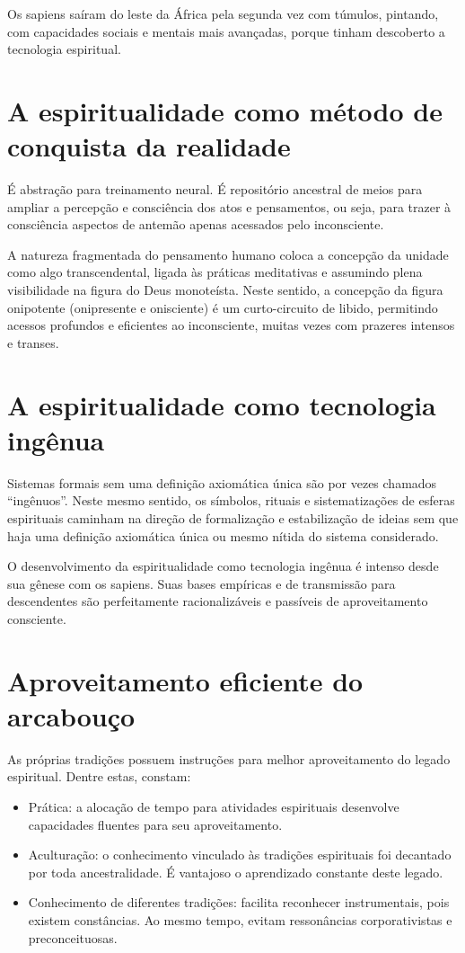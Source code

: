 \documentclass[a4paper]{article}
\begin{document}
\qquad Os sapiens saíram do leste da África pela segunda vez com túmulos,
pintando, com capacidades sociais e mentais mais avançadas, porque tinham
descoberto a tecnologia espiritual.

\section{A espiritualidade como método de conquista da realidade}\label{met}

\qquad É abstração para treinamento neural. É repositório ancestral de meios
para ampliar a percepção e consciência dos atos e pensamentos, ou seja, para
trazer à consciência aspectos de antemão apenas acessados pelo inconsciente.

A natureza fragmentada do pensamento humano coloca a concepção da unidade como
algo transcendental, ligada às práticas meditativas e assumindo plena
visibilidade na figura do Deus monoteísta. Neste sentido, a concepção da figura
onipotente (onipresente e onisciente) é um curto-circuito de libido, permitindo
acessos profundos e eficientes ao inconsciente, muitas vezes com prazeres
intensos e transes.

\section{A espiritualidade como tecnologia ingênua}

\qquad Sistemas formais sem uma definição axiomática única são por vezes
chamados ``ingênuos''. Neste mesmo sentido, os símbolos, rituais e
sistematizações de esferas espirituais caminham na direção de formalização e
estabilização de ideias sem que haja uma definição axiomática única ou mesmo
nítida do sistema considerado.

O desenvolvimento da espiritualidade como tecnologia ingênua é intenso desde sua
gênese com os sapiens. Suas bases empíricas e de transmissão para descendentes
são perfeitamente racionalizáveis e passíveis de aproveitamento consciente.

\section{Aproveitamento eficiente do arcabouço}

\qquad As próprias tradições possuem instruções para melhor aproveitamento do
legado espiritual. Dentre estas, constam:

\begin{itemize}
  \item Prática: a alocação de tempo para atividades espirituais desenvolve
  capacidades fluentes para seu aproveitamento.

  \item Aculturação: o conhecimento vinculado às tradições espirituais foi
  decantado por toda ancestralidade. É vantajoso o aprendizado constante deste
  legado.

  \item Conhecimento de diferentes tradições: facilita reconhecer instrumentais,
  pois existem constâncias. Ao mesmo tempo, evitam ressonâncias corporativistas
  e preconceituosas.
\end{itemize}
\end{document}
